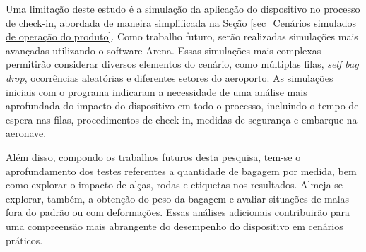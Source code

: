     Uma limitação deste estudo é a simulação da aplicação do dispositivo no processo de check-in, abordada de maneira simplificada na Seção \ref{sec_Cenários simulados de operação do produto}. Como trabalho futuro, serão realizadas simulações mais avançadas utilizando o software Arena. Essas simulações mais complexas permitirão considerar diversos elementos do cenário, como múltiplas filas, \textit{self bag drop}, ocorrências aleatórias e diferentes setores do aeroporto. As simulações iniciais com o programa indicaram a necessidade de uma análise mais aprofundada do impacto do dispositivo em todo o processo, incluindo o tempo de espera nas filas, procedimentos de check-in, medidas de segurança e embarque na aeronave.
    
    Além disso, compondo os trabalhos futuros desta pesquisa, tem-se o aprofundamento dos testes referentes a quantidade de bagagem por medida, bem como explorar o impacto de alças, rodas e etiquetas nos resultados. Almeja-se explorar, também, a obtenção do peso da bagagem e avaliar situações de malas fora do padrão ou com deformações.  Essas análises adicionais contribuirão para uma compreensão mais abrangente do desempenho do dispositivo em cenários práticos.

 

    